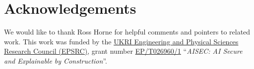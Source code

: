 \documentclass{lmcs}
\begin{document}
\maketitle








\section*{Acknowledgements}

We would like to thank Ross Horne for helpful comments and pointers to
related work. This work was funded by the
\href{https://www.ukri.org/about-us/epsrc/}{UKRI Engineering and
  Physical Sciences Research Council (EPSRC)}, grant number
\href{https://gow.epsrc.ukri.org/NGBOViewGrant.aspx?GrantRef=EP/T026960/1}{EP/T026960/1}
``\emph{AISEC: AI Secure and Explainable by Construction}''.





% 
\end{document}
